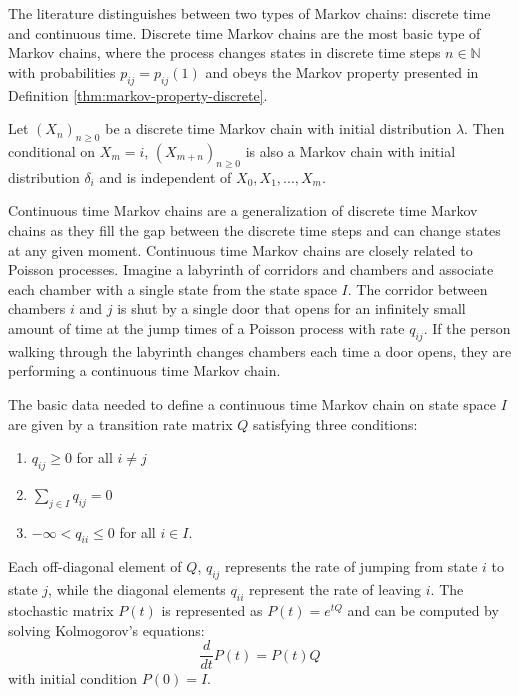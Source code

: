 
The literature distinguishes between two types of Markov chains: discrete time and continuous time.
Discrete time Markov chains are the most basic type of Markov chains, where the process
changes states in discrete time steps $n \in \mathbb{N}$ with probabilities $p_{ij} = p_{ij}(1)$
and obeys the Markov property presented in Definition \ref{thm:markov-property-discrete}.

\begin{defn}
\label{thm:markov-property-discrete}
Let $(X_n)_{n \ge 0}$ be a discrete time Markov chain with initial distribution $\lambda$.
Then conditional on $X_m = i$, $(X_{m + n})_{n \ge 0}$ is also a Markov chain with initial
distribution $\delta_i$ and is independent of $X_0, X_1, ..., X_m$.
\end{defn}

Continuous time Markov chains are a generalization of discrete time Markov chains as they
fill the gap between the discrete time steps and can change states at any given moment.
Continuous time Markov chains are closely related to Poisson processes. Imagine a labyrinth
of corridors and chambers and associate each chamber with a single state from the state space
$I$. The corridor between chambers $i$ and $j$
is shut by a single door that opens for an infinitely small amount of time at the jump times of
a Poisson process with rate $q_{ij}$. If the person walking through the labyrinth changes
chambers each time a door opens, they are performing
a continuous time Markov chain.

The basic data needed to define a continuous time Markov chain on state space $I$ are
given by a transition rate matrix $Q$ satisfying three conditions:

\begin{enumerate}
	\item $q_{ij} \ge 0$ for all $i \ne j$
	\item $\sum_{j \in I} q_{ij} = 0$
	\item $-\infty < q_{ii} \le 0$ for all $i \in I$.
\end{enumerate}

Each off-diagonal element of $Q$, $q_{ij}$ represents the rate of jumping from state $i$ to state $j$,
while the diagonal elements $q_{ii}$ represent the rate of leaving $i$. The stochastic matrix
$P(t)$ is represented as $P(t) = e^{tQ}$ and can be computed by solving Kolmogorov's equations:
\begin{equation}
	\nonumber
	\frac{d}{dt}P(t) = P(t)Q
\end{equation}
with initial condition $P(0) = I$.

